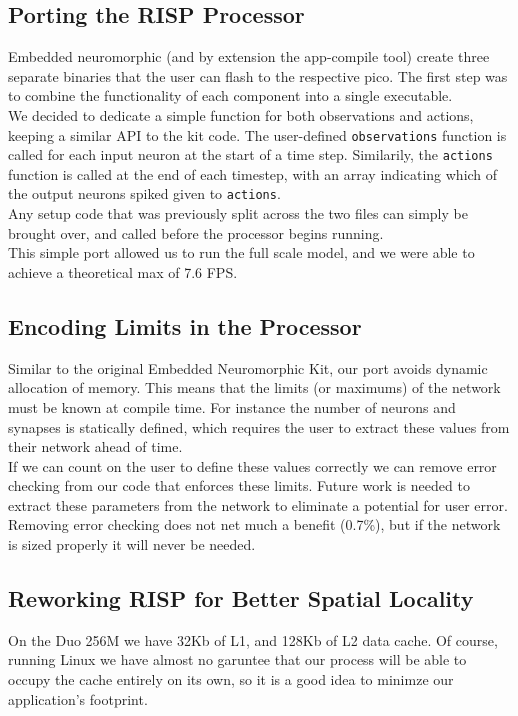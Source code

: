 \documentclass[conference]{IEEEtran}{}
\begin{document}
\subsection{Porting the RISP Processor}
\label{sec:org4f5232d}
Embedded neuromorphic (and by extension the app-compile tool) create three separate binaries that the user can flash to the respective pico. The first step was to combine the functionality of each component into a single executable.\\

We decided to dedicate a simple function for both observations and actions, keeping a similar API to the kit code. The user-defined \texttt{observations} function is called for each input neuron at the start of a time step. Similarily, the \texttt{actions} function is called at the end of each timestep, with an array indicating which of the output neurons spiked given to \texttt{actions}.\\

Any setup code that was previously split across the two files can simply be brought over, and called before the processor begins running.\\

This simple port allowed us to run the full scale model, and we were able to achieve a theoretical max of 7.6 FPS.\\
\subsection{Encoding Limits in the Processor}
\label{sec:orgfecf745}
Similar to the original Embedded Neuromorphic Kit, our port avoids dynamic allocation of memory. This means that the limits (or maximums) of the network must be known at compile time. For instance the number of neurons and synapses is statically defined, which requires the user to extract these values from their network ahead of time.\\

If we can count on the user to define these values correctly we can remove error checking from our code that enforces these limits. Future work is needed to extract these parameters from the network to eliminate a potential for user error.\\

Removing error checking does not net much a benefit (0.7\%), but if the network is sized properly it will never be needed.\\
\subsection{Reworking RISP for Better Spatial Locality}
\label{sec:orgedd4f43}
On the Duo 256M we have 32Kb of L1, and 128Kb of L2 data cache. Of course, running Linux we have almost no garuntee that our process will be able to occupy the cache entirely on its own, so it is a good idea to minimze our application's footprint.\\
\end{document}
